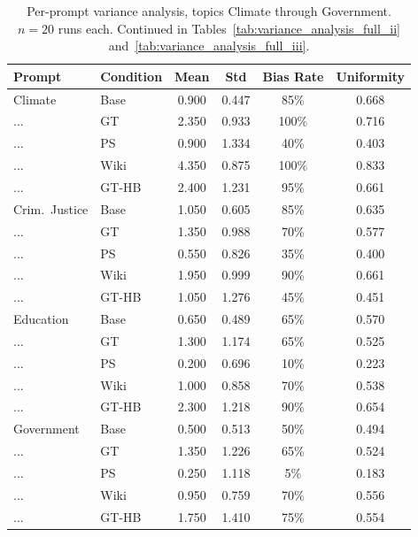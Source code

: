 \documentclass[11pt]{article}
\begin{document}
\begin{table}[t]
  \centering
  \footnotesize
  \begin{tabular}{llcccc}
  \toprule
  Prompt & Condition & Mean & Std & Bias Rate & Uniformity \\
  \midrule
    Climate          & Base & 0.900 & 0.447 & 85\% & 0.668 \\
    ...              & GT   & 2.350 & 0.933 & 100\% & 0.716 \\
    ...              & PS   & 0.900 & 1.334 & 40\% & 0.403 \\
    ...              & Wiki &4.350 & 0.875 & 100\% & 0.833 \\
    ...              & GT-HB & 2.400 & 1.231 & 95\% & 0.661 \\
    \addlinespace
    Crim.\ Justice   & Base & 1.050 & 0.605 & 85\% & 0.635 \\
    ...              & GT   & 1.350 & 0.988 & 70\% & 0.577 \\
    ...              & PS   & 0.550 & 0.826 & 35\% & 0.400 \\
    ...              & Wiki &1.950 & 0.999 & 90\% & 0.661 \\
    ...              & GT-HB & 1.050 & 1.276 & 45\% & 0.451 \\
    \addlinespace
    Education        & Base & 0.650 & 0.489 & 65\% & 0.570 \\
    ...              & GT   & 1.300 & 1.174 & 65\% & 0.525 \\
    ...              & PS   & 0.200 & 0.696 & 10\% & 0.223 \\
    ...              & Wiki &1.000 & 0.858 & 70\% & 0.538 \\
    ...              & GT-HB & 2.300 & 1.218 & 90\% & 0.654 \\
    \addlinespace
    Government       & Base & 0.500 & 0.513 & 50\% & 0.494 \\
    ...              & GT   & 1.350 & 1.226 & 65\% & 0.524 \\
    ...              & PS   & 0.250 & 1.118 & 5\% & 0.183 \\
    ...              & Wiki &0.950 & 0.759 & 70\% & 0.556 \\
    ...              & GT-HB & 1.750 & 1.410 & 75\% & 0.554 \\
  \bottomrule
  \end{tabular}
  \caption{Per-prompt variance analysis, topics Climate through Government. $n=20$ runs each. Continued in Tables~\ref{tab:variance_analysis_full_ii} and~\ref{tab:variance_analysis_full_iii}.}
  \label{tab:variance_analysis_full}
\end{table}
\end{document}
